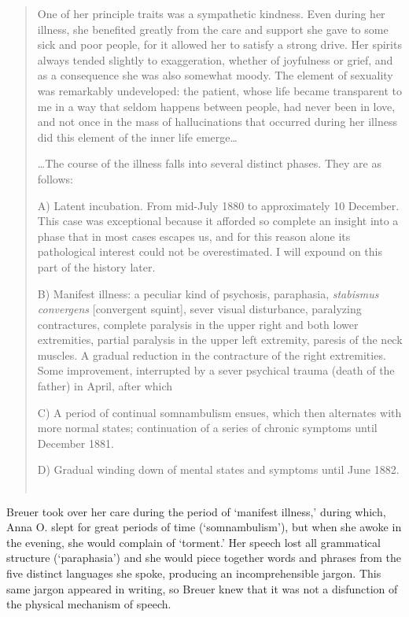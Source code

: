 \begin{refsection}
\begin{quote}
One of her principle traits was a sympathetic kindness. Even during her illness, she benefited greatly from the care and support she gave to some sick and poor people, for it allowed her to satisfy a strong drive. Her spirits always tended slightly to exaggeration, whether of joyfulness or grief, and as a consequence she was also somewhat moody. The element of sexuality was remarkably undeveloped: the patient, whose life became transparent to me in a way that seldom happens between people, had never been in love, and not once in the mass of hallucinations that occurred during her illness did this element of the inner life emerge{\ldots}

{\ldots}The course of the illness falls into several distinct phases. They are as follows:

A) Latent incubation. From mid-July 1880 to approximately 10 December. This case was exceptional because it afforded so complete an insight into a phase that in most cases escapes us, and for this reason alone its pathological interest could not be overestimated. I will expound on this part of the history later.

B) Manifest illness: a peculiar kind of psychosis, paraphasia, \emph{stabismus convergens} [convergent squint], sever visual disturbance, paralyzing contractures, complete paralysis in the upper right and both lower extremities, partial paralysis in the upper left extremity, paresis of the neck muscles. A gradual reduction in the contracture of the right extremities. Some improvement, interrupted by a sever psychical trauma (death of the father) in April, after which

C) A period of continual somnambulism ensues, which then alternates with more normal states; continuation of a series of chronic symptoms until December 1881.

D) Gradual winding down of mental states and symptoms until June 1882. ~\citep[p25--26]{Freud:kVwxqGOZ}
\end{quote}

Breuer took over her care during the period of `manifest illness,' during which, Anna O. slept for great periods of time (`somnambulism'), but when she awoke in the evening, she would complain of `torment.' Her speech lost all grammatical structure (`paraphasia') and she would piece together words and phrases from the five distinct languages she spoke, producing an incomprehensible jargon. This same jargon appeared in writing, so Breuer knew that it was not a disfunction of the physical mechanism of speech.


\end{refsection}
